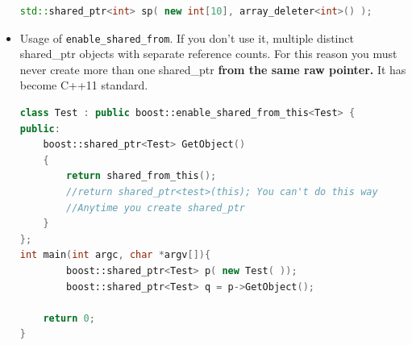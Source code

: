 \documentclass[a4paper,11pt,twoside]{book}
\begin{document}
\begin{itemize}
\begin{lstlisting}[frame=single, language=c++]
std::shared_ptr<int> sp( new int[10], array_deleter<int>() );
\end{lstlisting}

\item Usage of \texttt{enable\_shared\_from}. If you don't use it, multiple distinct shared\_ptr objects with separate reference counts. For this reason you must never create more than one shared\_ptr \textbf{from the same raw pointer.} It has become C++11 standard.
\begin{lstlisting}[frame=single, language=c++]
class Test : public boost::enable_shared_from_this<Test> {
public:
    boost::shared_ptr<Test> GetObject()
    {
        return shared_from_this();
        //return shared_ptr<test>(this); You can't do this way
        //Anytime you create shared_ptr
    }
};
int main(int argc, char *argv[]){
        boost::shared_ptr<Test> p( new Test( ));
        boost::shared_ptr<Test> q = p->GetObject();
    
    return 0;
}
\end{lstlisting}

\end{itemize}
\end{document}
